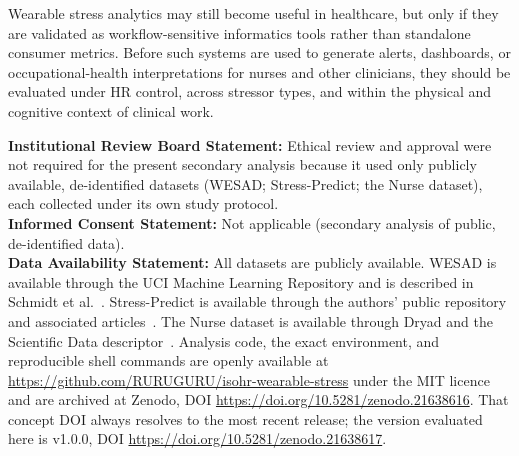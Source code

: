\documentclass[healthcare,article,submit,moreauthors,pdftex]{Definitions/mdpi}
\begin{document}
Wearable stress analytics may still become useful in healthcare, but only if they
are validated as workflow-sensitive informatics tools rather than standalone
consumer metrics. Before such systems are used to generate alerts, dashboards, or
occupational-health interpretations for nurses and other clinicians, they should
be evaluated under HR control, across stressor types, and within the physical and
cognitive context of clinical work.




\noindent\textbf{Institutional Review Board Statement:} Ethical review and
approval were not required for the present secondary analysis because it used
only publicly available, de-identified datasets (WESAD; Stress-Predict; the
Nurse dataset), each collected under its own study protocol.\\[3pt]
\noindent\textbf{Informed Consent Statement:} Not applicable (secondary analysis
of public, de-identified data).\\[3pt]
\noindent\textbf{Data Availability Statement:} All datasets are publicly
available. WESAD is available through the UCI Machine Learning Repository and is
described in Schmidt et al.~\cite{schmidt2018wesad,schmidt2018wesaddataset}.
Stress-Predict is available through the authors' public repository and
associated articles~\cite{talukdar2022stresspredict,iqbal2022ppgresp}. The
Nurse dataset is available through Dryad and the Scientific Data
descriptor~\cite{hosseini2021nursedryad,hosseini2022nurse}. Analysis code,
the exact environment, and reproducible shell commands are openly available at
\url{https://github.com/RURUGURU/isohr-wearable-stress} under the MIT licence and
are archived at Zenodo, DOI \url{https://doi.org/10.5281/zenodo.21638616}. That
concept DOI always resolves to the most recent release; the version evaluated
here is v1.0.0, DOI \url{https://doi.org/10.5281/zenodo.21638617}.
\end{document}
